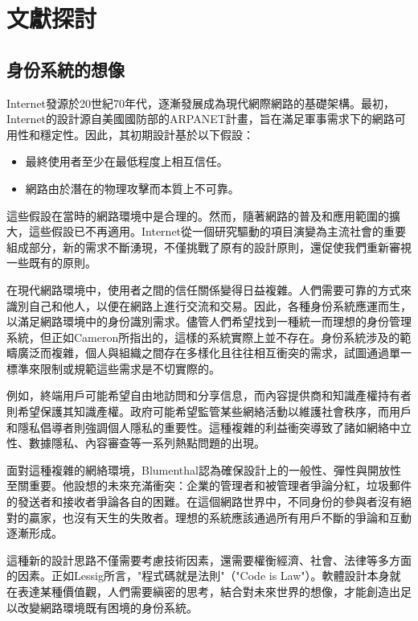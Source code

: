 
\chapter{文獻探討}
\section{身份系統的想像}
Internet發源於20世紀70年代，逐漸發展成為現代網際網路的基礎架構。最初，Internet的設計源自美國國防部的ARPANET計畫，旨在滿足軍事需求下的網路可用性和穩定性。因此，其初期設計基於以下假設\cite{Pekka2010HIP}：
\begin{itemize}
  \item 最終使用者至少在最低程度上相互信任。
  \item 網路由於潛在的物理攻擊而本質上不可靠。
\end{itemize}
這些假設在當時的網路環境中是合理的。然而，隨著網路的普及和應用範圍的擴大，這些假設已不再適用\cite{tomorrowinternet}。Internet從一個研究驅動的項目演變為主流社會的重要組成部分，新的需求不斷湧現，不僅挑戰了原有的設計原則，還促使我們重新審視一些既有的原則。

在現代網路環境中，使用者之間的信任關係變得日益複雜。人們需要可靠的方式來識別自己和他人，以便在網路上進行交流和交易。因此，各種身份系統應運而生，以滿足網路環境中的身份識別需求。儘管人們希望找到一種統一而理想的身份管理系統，但正如Cameron\cite{cameron2005laws}所指出的，這樣的系統實際上並不存在。身份系統涉及的範疇廣泛而複雜，個人與組織之間存在多樣化且往往相互衝突的需求，試圖通過單一標準來限制或規範這些需求是不切實際的。

例如，終端用戶可能希望自由地訪問和分享信息，而內容提供商和知識產權持有者則希望保護其知識產權。政府可能希望監管某些網絡活動以維護社會秩序，而用戶和隱私倡導者則強調個人隱私的重要性。這種複雜的利益衝突導致了諸如網絡中立性、數據隱私、內容審查等一系列熱點問題的出現\cite{Wu2003NetworkNeutrality}。

面對這種複雜的網絡環境，Blumenthal\cite{Blumenthal2001RethinkingThe}認為確保設計上的一般性、彈性與開放性至關重要。他設想的未來充滿衝突：企業的管理者和被管理者爭論分紅，垃圾郵件的發送者和接收者爭論各自的困難。在這個網路世界中，不同身份的參與者沒有絕對的贏家，也沒有天生的失敗者。理想的系統應該通過所有用戶不斷的爭論和互動逐漸形成。

這種新的設計思路不僅需要考慮技術因素，還需要權衡經濟、社會、法律等多方面的因素。正如Lessig\cite{lessig2000}所言，"程式碼就是法則"（"Code is Law"）。軟體設計本身就在表達某種價值觀，人們需要縝密的思考，結合對未來世界的想像，才能創造出足以改變網路環境既有困境的身份系統。

